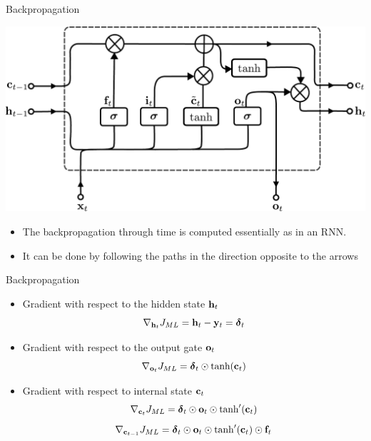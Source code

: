 \documentclass{beamer}
\begin{document}
\begin{frame}{Backpropagation}
\begin{center}
 \includegraphics[scale=0.4]{Module 5 (RNN)/pics/Long_Short-Term_Memory.pdf}
 \end{center} 
 \begin{itemize}
     \item The backpropagation through time is computed essentially as in an RNN.
     \item It can be done by following the paths in the direction opposite to the arrows
 \end{itemize}
\end{frame}
\begin{frame}{Backpropagation}

\begin{itemize}
    \item Gradient with respect to the hidden state ${\bf h}_t$
    \begin{equation}
        \nabla_{{\bf h}_t} J_{ML} = {\bf h}_t - {\bf y}_t = {\boldsymbol \delta}_t
    \end{equation}
    \item Gradient with respect to the output gate ${\bf o}_t$
    \begin{equation}
             \nabla_{{\bf o}_t} J_{ML} =  {\boldsymbol \delta}_t \odot \tanh({\bf c}_t)
    \end{equation}
    \item Gradient with respect to internal state ${\bf c}_t$
    \begin{equation}
         \nabla_{{\bf c}_t} J_{ML} = {\boldsymbol \delta}_t \odot {{\bf o}_t} \odot \tanh'({\bf c}_t)
    \end{equation}
     \begin{equation}
         \nabla_{{\bf c}_{t-1}} J_{ML} = {\boldsymbol \delta}_t \odot {{\bf o}_t} \odot \tanh'({\bf c}_t) \odot{{\bf f}_t}
    \end{equation}
\end{itemize}
\end{frame}
\end{document}
